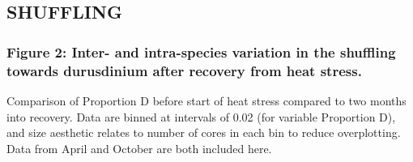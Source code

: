 \documentclass[]{article}
\begin{document}
\hypertarget{shuffling}{%
\subsection{SHUFFLING}\label{shuffling}}

\hypertarget{figure-2-inter--and-intra-species-variation-in-the-shuffling-towards-durusdinium-after-recovery-from-heat-stress.}{%
\subsubsection{Figure 2: Inter- and intra-species variation in the
shuffling towards durusdinium after recovery from heat
stress.}\label{figure-2-inter--and-intra-species-variation-in-the-shuffling-towards-durusdinium-after-recovery-from-heat-stress.}}

Comparison of Proportion D before start of heat stress compared to two
months into recovery. Data are binned at intervals of 0.02 (for variable
Proportion D), and size aesthetic relates to number of cores in each bin
to reduce overplotting. Data from April and October are both included
here.
\end{document}
